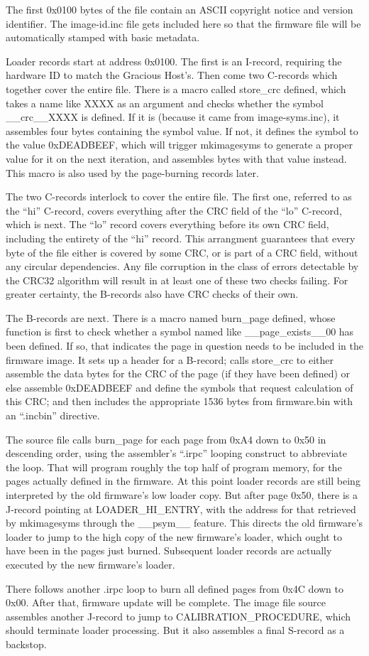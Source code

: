 The first 0x0100 bytes of the file contain an ASCII copyright notice and
version identifier.  The image-id.inc file gets included here so that the
firmware file will be automatically stamped with basic metadata.

Loader records start at address 0x0100.  The first is an I-record, requiring
the hardware ID to match the Gracious Host's.  Then come two C-records which
together cover the entire file.  There is a macro called store\_crc defined,
which takes a name like XXXX as an argument and checks whether the symbol
\_\_crc\_\_XXXX is defined.  If it is (because it came from image-syms.inc),
it assembles four bytes containing the symbol value.  If not, it defines the
symbol to the value 0xDEADBEEF, which will trigger mkimagesyms to generate a
proper value for it on the next iteration, and assembles bytes with that
value instead.  This macro is also used by the page-burning records later.

The two C-records interlock to cover the entire file.  The first one,
referred to as the ``hi'' C-record, covers everything after the CRC field of
the ``lo'' C-record, which is next.  The ``lo'' record covers everything
before its own CRC field, including the entirety of the ``hi'' record.  This
arrangment guarantees that every byte of the file either is covered by some
CRC, or is part of a CRC field, without any circular dependencies.  Any file
corruption in the class of errors detectable by the CRC32 algorithm will
result in at least one of these two checks failing.  For greater certainty,
the B-records also have CRC checks of their own.

The B-records are next.  There is a macro named burn\_page defined, whose
function is first to check whether a symbol named like
\_\_page\_exists\_\_00 has been defined.  If so, that indicates the
page in question needs to be included in the firmware image.  It sets up a
header for a B-record; calls store\_crc to either assemble the data bytes
for the CRC of the page (if they have been defined) or else assemble
0xDEADBEEF and define the symbols that request calculation of this CRC; and
then includes the appropriate 1536 bytes from firmware.bin with an
``.incbin'' directive.

The source file calls burn\_page for each page from 0xA4 down to 0x50 in
descending order, using the assembler's ``.irpc'' looping construct to
abbreviate the loop.  That will program roughly the top half of program
memory, for the pages actually defined in the firmware.  At this point
loader records are still being interpreted by the old firmware's low loader
copy.  But after page 0x50, there is a J-record pointing at
LOADER\_HI\_ENTRY, with the address for that retrieved by mkimagesyms
through the \_\_psym\_\_ feature.  This directs the old firmware's loader to
jump to the high copy of the new firmware's loader, which ought to have been
in the pages just burned.  Subsequent loader records are actually executed
by the new firmware's loader.

There follows another .irpc loop to burn all defined pages from 0x4C down to
0x00.  After that, firmware update will be complete.  The image file source
assembles another J-record to jump to CALIBRATION\_PROCEDURE, which should
terminate loader processing.  But it also assembles a final S-record as a
backstop.
